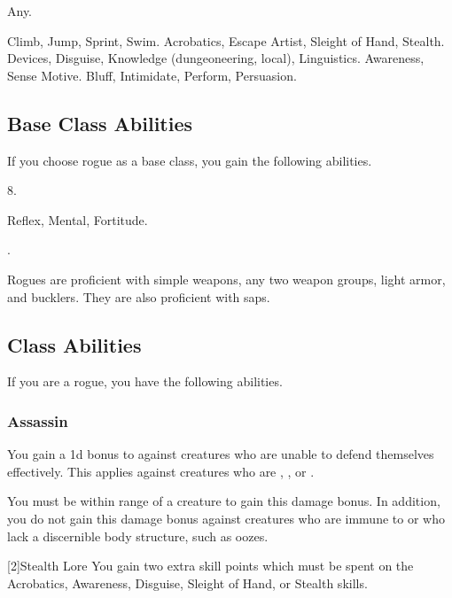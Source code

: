      Any.

     Climb, Jump, Sprint, Swim.
     Acrobatics, Escape Artist, Sleight of Hand, Stealth.
     Devices, Disguise, Knowledge (dungeoneering, local), Linguistics.
     Awareness, Sense Motive.
     Bluff, Intimidate, Perform, Persuasion.

    \subsection{Base Class Abilities}
        If you choose rogue as a base class, you gain the following abilities.

         8.

          Reflex,  Mental,  Fortitude.

         .

        Rogues are proficient with simple weapons, any two weapon groups, light armor, and bucklers.
        They are also proficient with saps.

    \subsection{Class Abilities}
        If you are a rogue, you have the following abilities.

        \subsubsection{Assassin}
             You gain a \plus1d bonus to  against creatures who are unable to defend themselves effectively.
            This applies against creatures who are \unaware, , or .

            You must be within \rngclose range of a creature to gain this damage bonus.
            In addition, you do not gain this damage bonus against creatures who are immune to  or who lack a discernible body structure, such as oozes.

            [2]{Stealth Lore} You gain two extra skill points which must be spent on the Acrobatics, Awareness, Disguise, Sleight of Hand, or Stealth skills.

